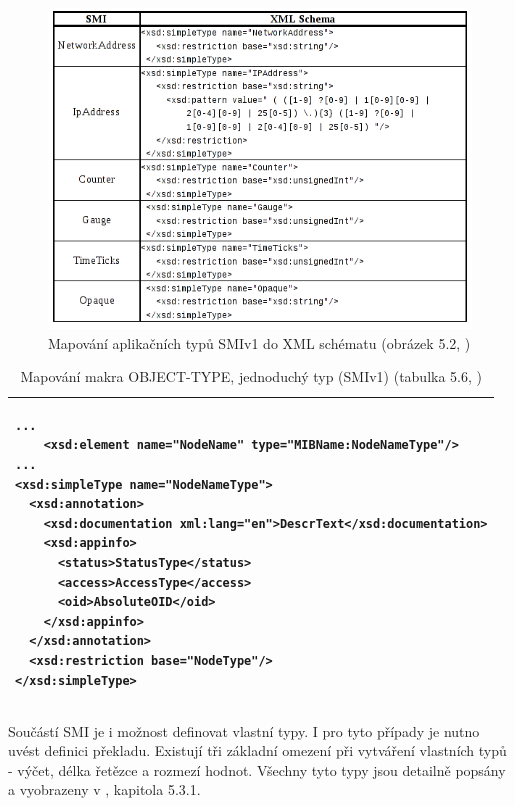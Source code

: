 \begin{figure}[htp]
	\begin{center}
		\includegraphics{obrazky/03_mapovani_smiv1.png}
		\caption{Mapování aplikačních typů SMIv1 do XML schématu (obrázek 5.2, \cite{macejko_dipl})}
		\label{obr_xml_smi1_typy}
	\end{center}
\end{figure}

\begin{table}
	\centering
	{\footnotesize
	  \begin{tabular}{|p{15cm}|}
      \hline
\begin{verbatim}...
    <xsd:element name="NodeName" type="MIBName:NodeNameType"/>
...
<xsd:simpleType name="NodeNameType">
  <xsd:annotation>
    <xsd:documentation xml:lang="en">DescrText</xsd:documentation>
    <xsd:appinfo>
      <status>StatusType</status>
      <access>AccessType</access>
      <oid>AbsoluteOID</oid>
    </xsd:appinfo>
  </xsd:annotation>
  <xsd:restriction base="NodeType"/>
</xsd:simpleType>\end{verbatim}\\
      \hline
    \end{tabular}
  }
	\caption{Mapování makra OBJECT-TYPE, jednoduchý typ (SMIv1) (tabulka 5.6, \cite{macejko_dipl})}
	\label{tab_xml_smi1_simple_type}
\end{table}

Součástí SMI je i možnost definovat vlastní typy. I pro tyto případy je nutno uvést definici překladu. Existují tři základní omezení při vytváření vlastních typů -
výčet, délka řetězce a rozmezí hodnot. Všechny tyto typy jsou detailně popsány a vyobrazeny v \cite{macejko_dipl}, kapitola 5.3.1.

